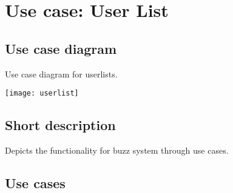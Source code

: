 

\section{Use case: User List}
	\subsection{Use case diagram}
		\begin{description}
		\item[Use case diagram for userlists.] 
	\end{description}

	\texttt{[image: userlist]}
	\subsection{Short description}
	\begin{description}
		\item[Depicts the functionality for buzz system through use cases.] 
	\end{description}
	\subsection{Use cases}

